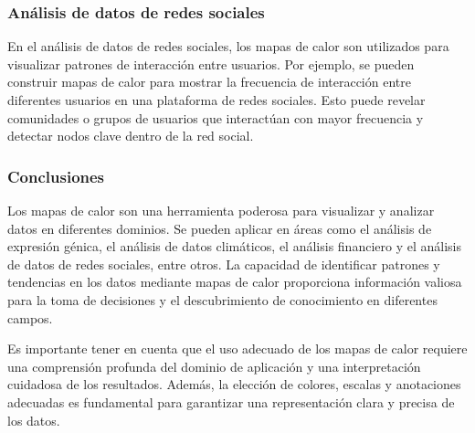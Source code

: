 \documentclass{article}
\begin{document}
\subsubsection{Análisis de datos de redes sociales}
En el análisis de datos de redes sociales, los mapas de calor son utilizados para visualizar patrones de interacción entre usuarios. Por ejemplo, se pueden construir mapas de calor para mostrar la frecuencia de interacción entre diferentes usuarios en una plataforma de redes sociales. Esto puede revelar comunidades o grupos de usuarios que interactúan con mayor frecuencia y detectar nodos clave dentro de la red social.

\subsubsection*{Conclusiones}
Los mapas de calor son una herramienta poderosa para visualizar y analizar datos en diferentes dominios. Se pueden aplicar en áreas como el análisis de expresión génica, el análisis de datos climáticos, el análisis financiero y el análisis de datos de redes sociales, entre otros. La capacidad de identificar patrones y tendencias en los datos mediante mapas de calor proporciona información valiosa para la toma de decisiones y el descubrimiento de conocimiento en diferentes campos.

Es importante tener en cuenta que el uso adecuado de los mapas de calor requiere una comprensión profunda del dominio de aplicación y una interpretación cuidadosa de los resultados. Además, la elección de colores, escalas y anotaciones adecuadas es fundamental para garantizar una representación clara y precisa de los datos.




\newpage
\end{document}
